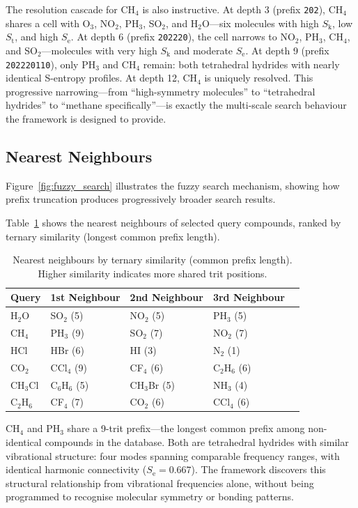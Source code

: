 \documentclass[11pt,twocolumn,a4paper]{article}
\theoremstyle{definition}
\theoremstyle{remark}
\newcommand{\Sk}{S_{\mathrm{k}}}
\newcommand{\St}{S_{\mathrm{t}}}
\newcommand{\Se}{S_{\mathrm{e}}}
\begin{document}
The resolution cascade for CH$_4$ is also instructive. At depth 3 (prefix \texttt{202}), CH$_4$ shares a cell with O$_3$, NO$_2$, PH$_3$, SO$_2$, and H$_2$O---six molecules with high $\Sk$, low $\St$, and high $\Se$. At depth 6 (prefix \texttt{202220}), the cell narrows to NO$_2$, PH$_3$, CH$_4$, and SO$_2$---molecules with very high $\Sk$ and moderate $\Se$. At depth 9 (prefix \texttt{202220110}), only PH$_3$ and CH$_4$ remain: both tetrahedral hydrides with nearly identical S-entropy profiles. At depth 12, CH$_4$ is uniquely resolved. This progressive narrowing---from ``high-symmetry molecules'' to ``tetrahedral hydrides'' to ``methane specifically''---is exactly the multi-scale search behaviour the framework is designed to provide.

\subsection{Nearest Neighbours}

Figure~\ref{fig:fuzzy_search} illustrates the fuzzy search mechanism, showing how prefix truncation produces progressively broader search results.



Table~\ref{tab:nearest} shows the nearest neighbours of selected query compounds, ranked by ternary similarity (longest common prefix length).

\begin{table}[H]
\centering
\caption{Nearest neighbours by ternary similarity (common prefix length). Higher similarity indicates more shared trit positions.}
\label{tab:nearest}
\begin{tabular}{lllll}
\toprule
Query & 1st Neighbour & 2nd Neighbour & 3rd Neighbour \\
\midrule
H$_2$O & SO$_2$ (5) & NO$_2$ (5) & PH$_3$ (5) \\
CH$_4$ & PH$_3$ (9) & SO$_2$ (7) & NO$_2$ (7) \\
HCl   & HBr (6) & HI (3) & N$_2$ (1) \\
CO$_2$ & CCl$_4$ (9) & CF$_4$ (6) & C$_2$H$_6$ (6) \\
CH$_3$Cl & C$_6$H$_6$ (5) & CH$_3$Br (5) & NH$_3$ (4) \\
C$_2$H$_6$ & CF$_4$ (7) & CO$_2$ (6) & CCl$_4$ (6) \\
\bottomrule
\end{tabular}
\end{table}

CH$_4$ and PH$_3$ share a 9-trit prefix---the longest common prefix among non-identical compounds in the database. Both are tetrahedral hydrides with similar vibrational structure: four modes spanning comparable frequency ranges, with identical harmonic connectivity ($\Se = 0.667$). The framework discovers this structural relationship from vibrational frequencies alone, without being programmed to recognise molecular symmetry or bonding patterns.
\end{document}
